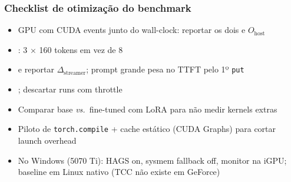 \documentclass[11pt, aspectratio=169, usepdftitle=false]{beamer}
\newcommand{\vs}{\textit{vs.}\ }
\begin{document}
\begin{frame}
\frametitle{Checklist de otimização do benchmark}
\begin{itemize}
\item {} GPU com CUDA events junto do wall-clock: reportar os dois e $O_{\text{host}}$
\item {}: 3 $\times$ 160 tokens em vez de 8
\item {} e reportar $\Delta_{\text{streamer}}$; prompt grande pesa no TTFT pelo 1º \texttt{put}
\item {}; descartar runs com throttle
\item Comparar base \vs fine-tuned com LoRA  para não medir kernels extras
\item Piloto de \texttt{torch.compile} + cache estático (CUDA Graphs) para cortar launch overhead
\item No Windows (5070 Ti): HAGS on, sysmem fallback off, monitor na iGPU; baseline em Linux nativo (TCC não existe em GeForce)
\end{itemize}
\end{frame}
\end{document}
